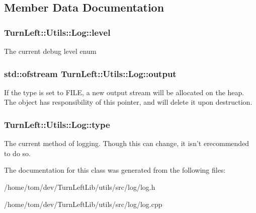 \subsection{Member Data Documentation}
\hypertarget{classTurnLeft_1_1Utils_1_1Log_a0b4784c3fe291b88c37c9661307b195c}{
\subsubsection[{level}]{ {\bf TurnLeft::Utils::Log::level}}}
\label{classTurnLeft_1_1Utils_1_1Log_a0b4784c3fe291b88c37c9661307b195c}
The current debug level enum \hypertarget{classTurnLeft_1_1Utils_1_1Log_abddbcefaefd8ea3c4614cdd88291fad2}{
\subsubsection[{output}]{\setlength{\rightskip}{0pt plus 5cm}std::ofstream {\bf TurnLeft::Utils::Log::output}}}
\label{classTurnLeft_1_1Utils_1_1Log_abddbcefaefd8ea3c4614cdd88291fad2}
If the type is set to FILE, a new output stream will be allocated on the heap. The object has responsibility of this pointer, and will delete it upon destruction. \hypertarget{classTurnLeft_1_1Utils_1_1Log_a896206177d2453f7776d8150b1ffa6bd}{
\subsubsection[{type}]{ {\bf TurnLeft::Utils::Log::type}}}
\label{classTurnLeft_1_1Utils_1_1Log_a896206177d2453f7776d8150b1ffa6bd}
The current method of logging. Though this can change, it isn't erecommended to do so. 

The documentation for this class was generated from the following files:\begin{DoxyCompactItemize}
\item 
/home/tom/dev/TurnLeftLib/utils/src/log/log.h\item 
/home/tom/dev/TurnLeftLib/utils/src/log/log.cpp\end{DoxyCompactItemize}
